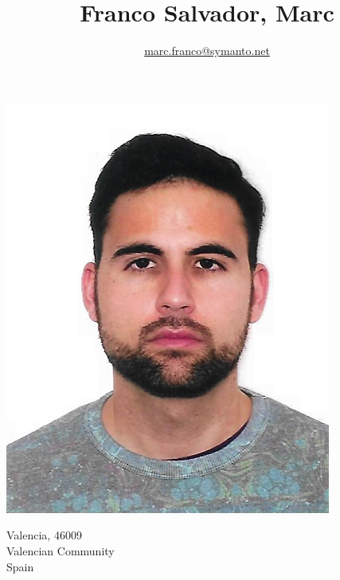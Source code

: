 \documentclass[10pt]{article}
\title{\bfseries\Huge Franco Salvador, Marc}
\author{\href{mailto:marc.franco@symanto.net}{marc.franco@symanto.net}}
\date{}
\begin{document}
\begin{minipage}{0.65\textwidth}
\begingroup
\let\center\flushleft
\let\endcenter\endflushleft
\maketitle
\endgroup
\end{minipage}
\begin{minipage}{0.3\textwidth}
\includegraphics[scale=0.3]{img/marc}
\end{minipage}

\begin{minipage}[ht]{0.48\textwidth}
Valencia, 46009\\
Valencian Community\\
Spain
\end{minipage}
\begin{minipage}[ht]{0.48\textwidth}

\end{minipage}

\vspace{2em}


\newcommand\VRule{\color{lightgray}\vrule width 0.5pt}
\end{document}
